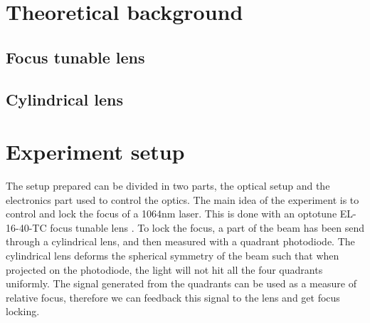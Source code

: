 \documentclass[a4paper,10pt]{article}
\begin{document}
\section{Theoretical background}
\subsection{Focus tunable lens}
\subsection{Cylindrical lens}

\section{Experiment setup}
The setup prepared can be divided in two parts, the optical setup and the electronics part used to control the optics. The main idea of the experiment is to control and lock the focus of a 1064nm laser. This is done with an optotune EL-16-40-TC focus tunable lens \cite{lens_datasheet}. To lock the focus, a part of the beam has been send through a cylindrical lens, and then measured with a quadrant photodiode. The cylindrical lens deforms the spherical symmetry of the beam such that when projected on the photodiode, the light will not hit all the four quadrants uniformly. The signal generated from the quadrants can be used as a measure of relative focus, therefore we can feedback this signal to the lens and get focus locking.
\end{document}

